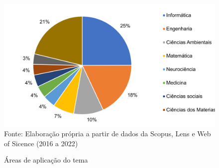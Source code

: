 \begin{figure}[H]
	\centering
	\caption{Áreas de aplicação do tema}
	\label{fig:areas}
	\includegraphics[width=1\linewidth]{Revisao/Figuras/areas}
	\vspace{0.2cm}
Fonte: Elaboração própria a partir de dados da Scopus, Lens e Web of Sicence (2016 a 2022)
\end{figure}
